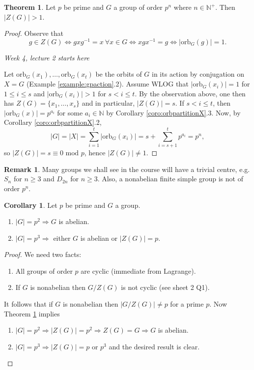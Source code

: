 \documentclass[a4paper]{article}
\newcommand{\N}{\mathbb{N}}
\newcommand{\orb}{\text{orb}}
\newcommand{\Mod}{\text{ mod }}
\theoremstyle{definition}
\newtheorem{thm}[defn]{Theorem}
\newtheorem{coro}[defn]{Corollary}
\newtheorem*{remark}{Remark}
\begin{document}
\begin{thm}
\label{thm:primepowerordergpnontrivZ}
Let $p$ be prime and $G$ a group of order $p^n$ where $n\in\N^+$. Then $|Z(G)|>1$.
\end{thm}
\begin{proof}
Observe that
\[
g\in Z(G)\Leftrightarrow gxg^{-1}=x \ \forall x\in G \Leftrightarrow xgx^{-1}=g \Leftrightarrow |\orb_G(g)|=1.
\]

\begin{flushright}
\textit{Week 4, lecture 2 starts here}
\end{flushright}

Let $\orb_G(x_1),\ldots,\orb_G(x_t)$ be the orbits of $G$ in its action by conjugation on $X=G$ (Example \ref{example:gpaction}.2). Assume WLOG that $|\orb_G(x_i)|=1$ for $1\leq i\leq s$ and $|\orb_G(x_i)|>1$ for $s<i\leq t$. By the observation above, one then has $Z(G)=\{x_1,\ldots,x_s\}$ and in particular, $|Z(G)|=s$. If $s<i\leq t$, then $|\orb_G(x)|=p^{a_i}$ for some $a_i\in \N$ by Corollary \ref{coro:orbpartitionX}.3. Now, by Corollary \ref{coro:orbpartitionX}.2,
\[
|G|=|X|=\sum_{i=1}^t \left|\orb_G(x_i)\right|=s+\sum_{i=s+1}^t p^{a_i}=p^n,
\]
so $|Z(G)|=s\equiv 0\Mod p$, hence $|Z(G)|\neq 1$.
\end{proof}

\begin{remark}
Many groups we shall see in the course will have a trivial centre, e.g. $S_n$ for $n\geq 3$ and $D_{2n}$ for $n\geq 3$. Also, a nonabelian finite simple group is not of order $p^n$.
\end{remark}

\begin{coro}
\label{coro:orderp2gpabelian}
Let $p$ be prime and $G$ a group.
\begin{enumerate}
\item $|G|=p^2\Rightarrow G$ is abelian.
\item $|G|=p^3\Rightarrow$ either $G$ is abelian or $|Z(G)|=p$.
\end{enumerate}
\end{coro}
\begin{proof}
We need two facts:
\begin{enumerate}
\item All groups of order $p$ are cyclic (immediate from Lagrange).
\item If $G$ is nonabelian then $G/Z(G)$ is not cyclic (see sheet 2 Q1).
\end{enumerate}
It follows that if $G$ is nonabelian then $|G/Z(G)|\neq p$ for a prime $p$. Now Theorem \ref{thm:primepowerordergpnontrivZ} implies
\begin{enumerate}
\item $|G|=p^2\Rightarrow |Z(G)|=p^2\Rightarrow Z(G)=G \Rightarrow G$ is abelian.
\item $|G|=p^3\Rightarrow |Z(G)|=p$ or $p^3$ and the desired result is clear.
\end{enumerate}
\end{proof}
\end{document}
